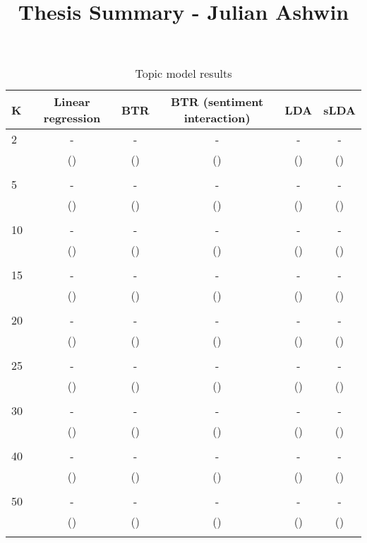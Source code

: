 \documentclass[11pt]{article}
\title{Thesis Summary - Julian Ashwin}
\author{}
\date{}
\begin{document}
	
	\maketitle
	
	\vspace*{-2cm}
	
	
\begin{table}[H]
	\centering
	\caption{Topic model results}
	\label{ch3:tab:btr_results}
	\begin{tabular}{lccccc}
		K & Linear regression & BTR & BTR (sentiment interaction) & LDA & sLDA \\
		\midrule
		2 & -     & -     & -     & - & -  \\
		& () & () & () & () & () \\
		&  &  &  &  &  \\
		5 & -     & -     & -     & - & -  \\
		& () & () & () & () & () \\
		&  &  &  &  &  \\
		10 & -     & -     & -     & - & -  \\
		& () & () & () & () & () \\
		&  &  &  &  &  \\
		15 & -     & -     & -     & - & -  \\
		& () & () & () & () & () \\
		&  &  &  &  &  \\
		20 & -     & -     & -     & - & -  \\
		& () & () & () & () & () \\
		&  &  &  &  &  \\
		25 & -     & -     & -     & - & -  \\
		& () & () & () & () & () \\
		&  &  &  &  &  \\
		30 & -     & -     & -     & - & -  \\
		& () & () & () & () & () \\
		&  &  &  &  &  \\
		40 & -     & -     & -     & - & -  \\
		& () & () & () & () & () \\
		&  &  &  &  &  \\
		50 & -     & -     & -     & - & -  \\
		& () & () & () & () & () \\
		&  &  &  &  &  \\
		\bottomrule
	\end{tabular}
\end{table}%
\end{document}
